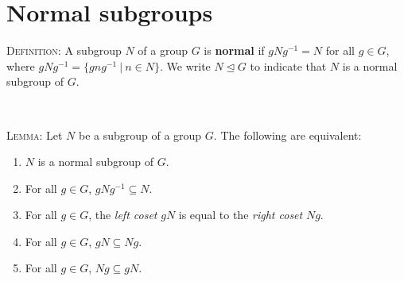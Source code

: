 \documentclass[12pt]{amsart}
\newcommand{\showsol}[1]{\def\displaysol{#1}}
\begin{document}
\showsol{0}
	
	\thispagestyle{empty}
	
	\section*{Normal subgroups}
	
	

\begin{framed}
\textsc{Definition:} A subgroup $N$ of a group $G$ is \textbf{normal} if $gNg^{-1} = N$ for all $g\in G$, where \newline $gNg^{-1} = \{ gng^{-1} \ | \ n\in N\}$. We write $N\trianglelefteq G$ to indicate that $N$ is a normal subgroup of $G$.

\


\textsc{Lemma:} Let $N$ be a subgroup of a group $G$. The following are equivalent:
\begin{enumerate}[(1)]
\item $N$ is a normal subgroup of $G$.
\item For all $g\in G$, $gNg^{-1} \subseteq N$.
\item For all $g\in G$, the \emph{left coset} $gN$ is equal to the \emph{right coset} $Ng$.
\item For all $g\in G$, $gN \subseteq Ng$.
\item For all $g\in G$, $Ng \subseteq gN$.
\end{enumerate}
\end{framed}

\smallskip
\end{document}
